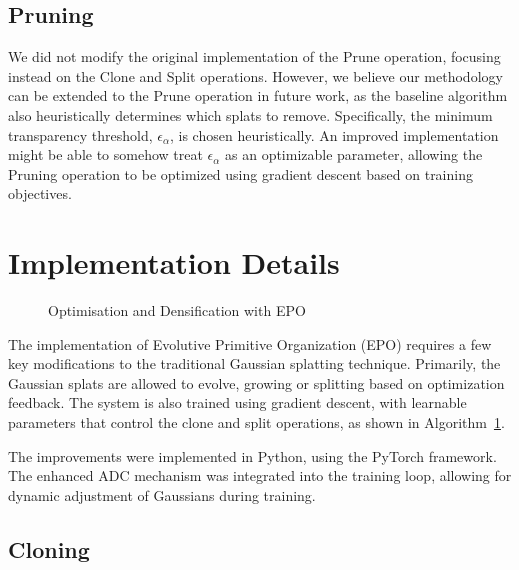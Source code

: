 \documentclass[11pt]{report}
\begin{document}
\subsection{Pruning}
\label{subsec:improved_pruning}

We did not modify the original implementation of the Prune operation, focusing instead on the Clone and Split operations. However, we believe our methodology can be extended to the Prune operation in future work, as the baseline algorithm also heuristically determines which splats to remove. Specifically, the minimum transparency threshold, $\epsilon_{\alpha}$, is chosen heuristically. An improved implementation might be able to somehow treat $\epsilon_{\alpha}$ as an optimizable parameter, allowing the Pruning operation to be optimized using gradient descent based on training objectives.

\section{Implementation Details}

\begin{figure}[htb]
    \centering
    \begin{minipage}{0.75\textwidth}
        \begin{algorithm}[H]
            
            \caption{Optimisation and Densification with EPO}
            \label{alg:our_algorithm} 
        \end{algorithm}
    \end{minipage}
\end{figure}

The implementation of Evolutive Primitive Organization (EPO) requires a few key modifications to the traditional Gaussian splatting technique. Primarily, the Gaussian splats are allowed to evolve, growing or splitting based on optimization feedback. The system is also trained using gradient descent, with learnable parameters that control the clone and split operations, as shown in Algorithm~\ref{alg:our_algorithm}.

The improvements were implemented in Python, using the PyTorch framework. The enhanced ADC mechanism was integrated into the training loop, allowing for dynamic adjustment of Gaussians during training.

\subsection{Cloning}
\end{document}
